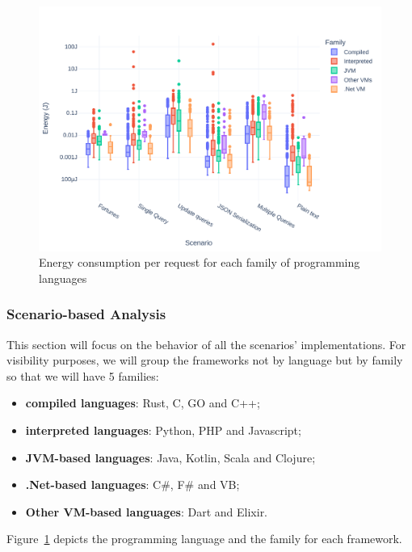 \begin{figure}[bht]
    \centering
    \includegraphics[width=.9\columnwidth ]{imgs/all_boxplot}
    \caption{Energy consumption per request for each family of programming languages}
    \label{fig:all_boxplot}
\end{figure}




\subsubsection{Scenario-based Analysis}
This section will focus on the behavior of all the scenarios' implementations.
For visibility purposes, we will group the frameworks not by language but by family so that we will have 5 families:
\begin{itemize}
    \item \textbf{compiled languages}: Rust, C, GO and C++;
    \item \textbf{interpreted languages}: Python, PHP and Javascript;
    \item \textbf{JVM-based languages}: Java, Kotlin, Scala and Clojure;
    \item \textbf{.Net-based languages}: C\#, F\# and VB;
    \item \textbf{Other VM-based languages}: Dart and Elixir.
\end{itemize}

Figure~\ref{fig:all_boxplot} depicts the programming language and the family for each framework.

